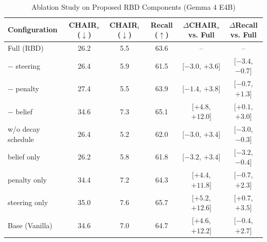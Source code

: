 \begin{table}[t]
  \centering
  \caption{Ablation Study on Proposed RBD Components (Gemma 4 E4B)}
  \label{tab:ablation_study_gemma}
  \small
  \setlength{\tabcolsep}{4pt}
  \begin{tabular}{lccccc}
    \toprule
    \textbf{Configuration} & \textbf{CHAIR$_s$ ($\downarrow$)} & \textbf{CHAIR$_i$ ($\downarrow$)} & \textbf{Recall ($\uparrow$)} & \textbf{$\Delta$CHAIR$_s$ vs. Full} & \textbf{$\Delta$Recall vs. Full} \\
    \midrule
    Full (RBD) & 26.2 & 5.5 & 63.6 & -- & -- \\
    \midrule
    $-$ steering & 26.4 & 5.9 & 61.5 & [$-3.0$, $+3.6$] & [$-3.4$, $-0.7$] \\
    $-$ penalty & 27.4 & 5.5 & 63.9 & [$-1.4$, $+3.8$] & [$-0.7$, $+1.3$] \\
    $-$ belief & 34.6 & 7.3 & 65.1 & [$+4.8$, $+12.0$] & [$+0.1$, $+3.0$] \\
    \midrule
    w/o decay schedule & 26.4 & 5.2 & 62.0 & [$-3.0$, $+3.4$] & [$-3.0$, $-0.3$] \\
    belief only & 26.2 & 5.8 & 61.8 & [$-3.2$, $+3.4$] & [$-3.2$, $-0.4$] \\
    penalty only & 34.4 & 7.2 & 64.3 & [$+4.4$, $+11.8$] & [$-0.7$, $+2.3$] \\
    steering only & 35.0 & 7.6 & 65.7 & [$+5.2$, $+12.6$] & [$+0.7$, $+3.5$] \\
    \midrule
    Base (Vanilla) & 34.6 & 7.0 & 64.7 & [$+4.6$, $+12.2$] & [$-0.4$, $+2.7$] \\
    \bottomrule
  \end{tabular}
\end{table}
